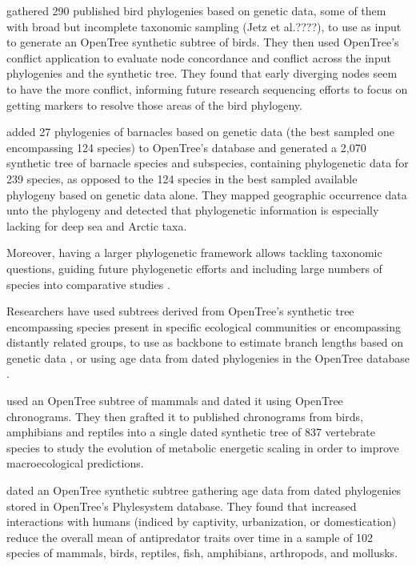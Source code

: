 \documentclass[oupdraft]{sysbio_sse}
\begin{document}
\citep{brown2017development} gathered 290 published bird phylogenies based on genetic
data, some of them with broad but incomplete taxonomic sampling (Jetz et al.????),
to use as input to generate an OpenTree synthetic subtree of birds.
They then used OpenTree's conflict application to evaluate node concordance and
conflict across the input phylogenies and the synthetic tree. They found that early diverging nodes
 seem to have the more conflict, informing future research sequencing efforts to
 focus on getting markers to resolve those areas of the bird phylogeny.

\citep{ewers2019towards} added 27 phylogenies of barnacles based on genetic data
(the best sampled one encompassing 124 species) to OpenTree's database and generated
a 2,070 synthetic tree of barnacle species and subspecies, containing phylogenetic
data for 239 species, as opposed to the 124 species in the best sampled available
phylogeny based on genetic data alone. They mapped geographic occurrence data unto
the phylogeny and detected that phylogenetic information is especially lacking for
deep sea and Arctic taxa.

Moreover, having a larger phylogenetic framework allows tackling taxonomic questions,
guiding future phylogenetic efforts and including large numbers of species into
comparative studies \citep{ewers2019towards}.

Researchers have used subtrees derived from OpenTree's synthetic tree encompassing species present
in specific ecological communities or encompassing distantly related groups, to
use as backbone to estimate branch lengths
based on genetic data \citep{allen2019spatial, smith2018constructing}, or using
age data from dated phylogenies in the OpenTree database \citep{uyeda2017evolution, geffroy2020evolutionary}.

\citep{uyeda2017evolution} used an OpenTree subtree of mammals and dated it using OpenTree
chronograms. They then grafted it to published chronograms from birds, amphibians
and reptiles into a single dated synthetic tree of 837 vertebrate species to study
the evolution of metabolic energetic scaling in order to improve macroecological predictions.

\citep{geffroy2020evolutionary} dated an OpenTree synthetic subtree gathering age data
from dated phylogenies stored in OpenTree's Phylesystem database. They found that
increased interactions with humans (indiced by captivity, urbanization, or domestication)
reduce the overall mean of antipredator traits over time in a sample of 102 species
of mammals, birds, reptiles, fish, amphibians, arthropods, and mollusks.
\end{document}
